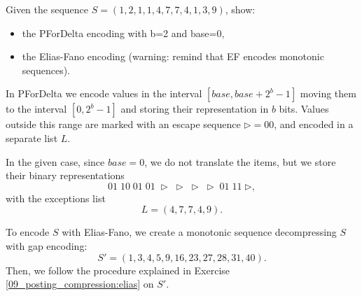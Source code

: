 \exercise

Given the sequence $S = (1, 2, 1, 1, 4, 7, 7, 4, 1, 3, 9)$, show:
%
\begin{itemize}
  \item the PForDelta encoding with b=2 and base=0,
  \item the Elias-Fano encoding (warning: remind that EF encodes monotonic
    sequences).
\end{itemize}

\solution

In PForDelta we encode values in the interval $[base,base+2^b-1]$ moving
them to the interval $[0, 2^b-1]$ and storing their representation in $b$ bits.
Values outside this range are marked with an escape sequence
$\triangleright=00$, and encoded in a separate list $L$.

In the given case, since $base=0$, we do not translate the items, but we store
their binary representations
%
$$01\;10\;01\;01\;\triangleright\;\triangleright\;\triangleright\;\triangleright\;01\;11\;\triangleright,$$
%
with the exceptions list
$$L=(4,7,7,4,9).$$

To encode $S$ with Elias-Fano, we create a monotonic sequence decompressing $S$
with gap encoding:
%
$$S'=(1,3,4,5,9,16,23,27,28,31,40).$$
%
Then, we follow the procedure explained in Exercise
\ref{09_posting_compression:elias} on $S'$.

